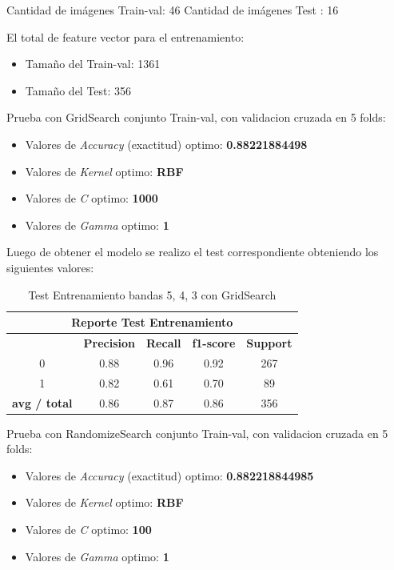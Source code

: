 Cantidad de imágenes Train-val: 46 
Cantidad de imágenes Test : 16  

El total de feature vector para el entrenamiento:
\begin{itemize}
\item Tamaño del Train-val: 1361
\item Tamaño del Test: 356
\end{itemize}

Prueba con GridSearch conjunto Train-val, con validacion cruzada en 5 folds:

\begin{itemize}
\item Valores de \textit{Accuracy} (exactitud) optimo: \textbf{0.88221884498}
\item Valores de \textit{Kernel} optimo: \textbf{RBF}
\item Valores de \textit{C} optimo: \textbf{1000}
\item Valores de \textit{Gamma} optimo: \textbf{1}

\end{itemize}

Luego de obtener el modelo se realizo el test correspondiente obteniendo los siguientes valores:
\begin{table}[H]
\begin{center}
\begin{tabular}{|c|c|c|c|c|}
\hline \multicolumn{5}{|c|}{Reporte Test Entrenamiento} \\ \hline
\hline \textbf{} & \textbf{Precision} & \textbf{Recall} & \textbf{f1-score} & \textbf{Support}\\ \hline 
				 0   & 0.88 & 0.96 & 0.92  & 267	\\ \hline 
				 1   & 0.82 & 0.61 & 0.70  & 89 \\ \hline 
\textbf{avg / total} & 0.86 & 0.87 & 0.86  & 356 \\ \hline
\end{tabular}
\end{center} \caption{Test Entrenamiento bandas 5, 4, 3 con GridSearch}\label{tab:gridsearchtest543}
\end{table}


Prueba con RandomizeSearch conjunto Train-val, con validacion cruzada en 5 folds:

\begin{itemize}
\item Valores de \textit{Accuracy} (exactitud) optimo: \textbf{0.882218844985}
\item Valores de \textit{Kernel} optimo: \textbf{RBF}
\item Valores de \textit{C} optimo: \textbf{100}
\item Valores de \textit{Gamma} optimo: \textbf{1}

\end{itemize}

